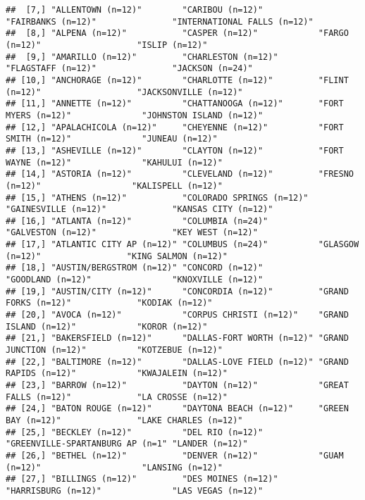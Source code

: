 \documentclass[
]{book}
\begin{document}
\begin{verbatim}
##  [7,] "ALLENTOWN (n=12)"        "CARIBOU (n=12)"           "FAIRBANKS (n=12)"               "INTERNATIONAL FALLS (n=12)"
##  [8,] "ALPENA (n=12)"           "CASPER (n=12)"            "FARGO (n=12)"                   "ISLIP (n=12)"              
##  [9,] "AMARILLO (n=12)"         "CHARLESTON (n=12)"        "FLAGSTAFF (n=12)"               "JACKSON (n=24)"            
## [10,] "ANCHORAGE (n=12)"        "CHARLOTTE (n=12)"         "FLINT (n=12)"                   "JACKSONVILLE (n=12)"       
## [11,] "ANNETTE (n=12)"          "CHATTANOOGA (n=12)"       "FORT MYERS (n=12)"              "JOHNSTON ISLAND (n=12)"    
## [12,] "APALACHICOLA (n=12)"     "CHEYENNE (n=12)"          "FORT SMITH (n=12)"              "JUNEAU (n=12)"             
## [13,] "ASHEVILLE (n=12)"        "CLAYTON (n=12)"           "FORT WAYNE (n=12)"              "KAHULUI (n=12)"            
## [14,] "ASTORIA (n=12)"          "CLEVELAND (n=12)"         "FRESNO (n=12)"                  "KALISPELL (n=12)"          
## [15,] "ATHENS (n=12)"           "COLORADO SPRINGS (n=12)"  "GAINESVILLE (n=12)"             "KANSAS CITY (n=12)"        
## [16,] "ATLANTA (n=12)"          "COLUMBIA (n=24)"          "GALVESTON (n=12)"               "KEY WEST (n=12)"           
## [17,] "ATLANTIC CITY AP (n=12)" "COLUMBUS (n=24)"          "GLASGOW (n=12)"                 "KING SALMON (n=12)"        
## [18,] "AUSTIN/BERGSTROM (n=12)" "CONCORD (n=12)"           "GOODLAND (n=12)"                "KNOXVILLE (n=12)"          
## [19,] "AUSTIN/CITY (n=12)"      "CONCORDIA (n=12)"         "GRAND FORKS (n=12)"             "KODIAK (n=12)"             
## [20,] "AVOCA (n=12)"            "CORPUS CHRISTI (n=12)"    "GRAND ISLAND (n=12)"            "KOROR (n=12)"              
## [21,] "BAKERSFIELD (n=12)"      "DALLAS-FORT WORTH (n=12)" "GRAND JUNCTION (n=12)"          "KOTZEBUE (n=12)"           
## [22,] "BALTIMORE (n=12)"        "DALLAS-LOVE FIELD (n=12)" "GRAND RAPIDS (n=12)"            "KWAJALEIN (n=12)"          
## [23,] "BARROW (n=12)"           "DAYTON (n=12)"            "GREAT FALLS (n=12)"             "LA CROSSE (n=12)"          
## [24,] "BATON ROUGE (n=12)"      "DAYTONA BEACH (n=12)"     "GREEN BAY (n=12)"               "LAKE CHARLES (n=12)"       
## [25,] "BECKLEY (n=12)"          "DEL RIO (n=12)"           "GREENVILLE-SPARTANBURG AP (n=1" "LANDER (n=12)"             
## [26,] "BETHEL (n=12)"           "DENVER (n=12)"            "GUAM (n=12)"                    "LANSING (n=12)"            
## [27,] "BILLINGS (n=12)"         "DES MOINES (n=12)"        "HARRISBURG (n=12)"              "LAS VEGAS (n=12)"          

\end{verbatim}
\end{document}
